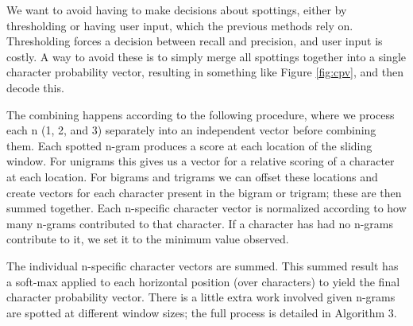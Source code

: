 \documentclass[ms,electronic,twosidetoc,letterpaper,chaptercenter,parttop,lof,lot]{byumsphd}
\begin{document}
We want to avoid having to make decisions about spottings, either by thresholding or having user input, which the previous methods rely on. Thresholding forces a decision between recall and precision, and user input is costly. A way to avoid these is to simply merge all spottings together into a single character probability vector, resulting in something like Figure \ref{fig:cpv}, and then decode this.



The combining happens according to the following procedure, where we process each n (1, 2, and 3) separately into an independent vector before combining them. Each spotted n-gram produces a score at each location of the sliding window. For unigrams this gives us a vector for a relative scoring of a character at each location. For bigrams and trigrams we can offset these locations and create vectors for each character present in the bigram or trigram; these are then summed together.
Each n-specific character vector is normalized according to how many n-grams contributed to that character. If a character has had no n-grams contribute to it, we set it to the minimum value observed.

The individual n-specific character vectors are summed. %
This summed result has a soft-max applied to each horizontal position (over characters) to yield the final character probability vector.
There is a little extra work involved given n-grams are spotted at different window sizes; the full process is detailed in Algorithm 3.
\end{document}

